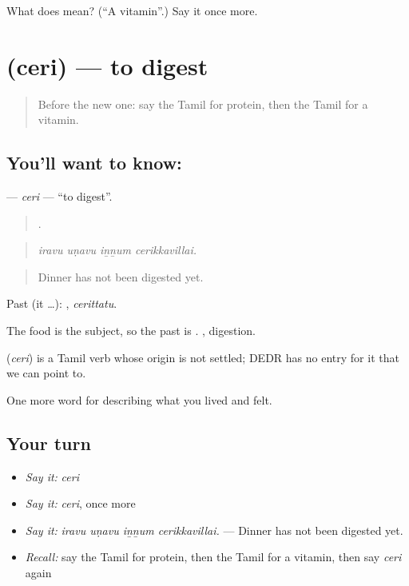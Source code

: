 \begin{tcolorbox}[breakable,colback=teal!4,colframe=teal!35!black,title={Before you move on}]
What does  mean? (\textquotedblleft{}A vitamin\textquotedblright{}.) Say it once more.
\end{tcolorbox}
\section[\texorpdfstring{\ta{செரி} (ceri)}{செரி (ceri)}]{ (ceri) — to digest}

\label{lesson:TA-C487-ceri}



\begin{quote}
Before the new one: say the Tamil for protein, then the Tamil for a vitamin.
\end{quote}

\subsection*{You'll want to know: }
\textbf{} — \emph{ceri} — \textquotedblleft{}to digest\textquotedblright{}.

\begin{quote}
   .
\end{quote}

\begin{quote}
\emph{iravu uṇavu iṉṉum cerikkavillai.}
\end{quote}

\begin{quote}
Dinner has not been digested yet.
\end{quote}

Past (it …): , \emph{cerittatu}.

The food is the subject, so the past is . , digestion.

\begin{cousinweb}
\textbf{} (\emph{ceri}) is a Tamil verb whose origin is not settled; DEDR has no entry for it that we can point to.
\end{cousinweb}

\begin{grammarlens}[title={What you've built}]
One more word for describing what you lived and felt.
\end{grammarlens}

\subsection*{Your turn}
\begin{itemize}
\raggedright
  \item \emph{Say it:} \emph{ceri}
  \item \emph{Say it:} \emph{ceri}, once more
  \item \emph{Say it:} \emph{iravu uṇavu iṉṉum cerikkavillai.} — Dinner has not been digested yet.
  \item \emph{Recall:} say the Tamil for protein, then the Tamil for a vitamin, then say \emph{ceri} again
\end{itemize}


